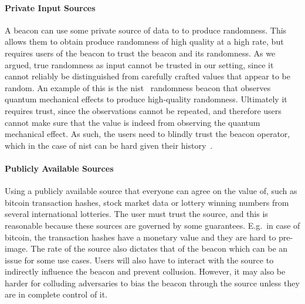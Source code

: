 \paragraph{Private Input Sources} A beacon can use some private source of data to to produce randomness. This allows them to obtain produce randomness of high quality at a high rate, but requires users of the beacon to trust the beacon and its randomness.
As we argued, true randomness as input cannot be trusted in our setting, since it cannot reliably be distinguished from carefully crafted values that appear to be random.
An example of this is the \gls{nist}~\cite{nistbeacon} randomness beacon that observes quantum mechanical effects to produce high-quality randomness.
Ultimately it requires trust, since the observations cannot be repeated, and therefore users cannot make sure that the value is indeed from observing the quantum mechanical effect.
As such, the users need to blindly trust the beacon operator, which in the case of \gls{nist} can be hard given their history~\cite{nytimes-nsabackdoors, nytimes-nsaconstants, nist2014backdoor}.


\paragraph{Publicly Available Sources} Using a publicly available source that everyone can agree on the value of, such as bitcoin transaction hashes, stock market data or lottery winning numbers from several international lotteries.
The user must trust the source, and this is reasonable because these sources are governed by some guarantees. E.g.\ in case of bitcoin, the transaction hashes have a monetary value and they are hard to pre-image. The rate of the source also dictates that of the beacon which can be an issue for some use cases. Users will also have to interact with the source to indirectly influence the beacon and prevent collusion. However, it may also be harder for colluding adversaries to bias the beacon through the source unless they are in complete control of it.

